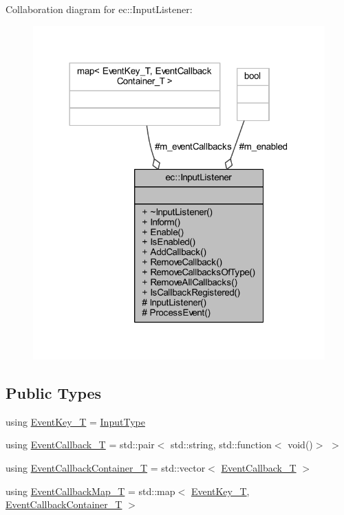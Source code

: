 Collaboration diagram for ec\+:\+:Input\+Listener\+:
\nopagebreak
\begin{figure}[H]
\begin{center}
\leavevmode
\includegraphics[width=318pt]{classec_1_1_input_listener__coll__graph}
\end{center}
\end{figure}
\subsection*{Public Types}
\begin{DoxyCompactItemize}
\item 
using \mbox{\hyperlink{classec_1_1_input_listener_a741cc6a2d59a823b5bfbc4e48e1a147f}{Event\+Key\+\_\+T}} = \mbox{\hyperlink{namespaceec_a5de6bdb8c4b2ed6e590e721ec998f964}{Input\+Type}}
\item 
using \mbox{\hyperlink{classec_1_1_input_listener_a6d62bd83a0cb80c979711d26722c8c6d}{Event\+Callback\+\_\+T}} = std\+::pair$<$ std\+::string, std\+::function$<$ void()$>$ $>$
\item 
using \mbox{\hyperlink{classec_1_1_input_listener_a3bb7086fdca1d1a76428b1e737e9e002}{Event\+Callback\+Container\+\_\+T}} = std\+::vector$<$ \mbox{\hyperlink{classec_1_1_input_listener_a6d62bd83a0cb80c979711d26722c8c6d}{Event\+Callback\+\_\+T}} $>$
\item 
using \mbox{\hyperlink{classec_1_1_input_listener_a13553604a5ae8c32fa95d304206aa01a}{Event\+Callback\+Map\+\_\+T}} = std\+::map$<$ \mbox{\hyperlink{namespaceec_a5de6bdb8c4b2ed6e590e721ec998f964}{Event\+Key\+\_\+T}}, \mbox{\hyperlink{classec_1_1_input_listener_a3bb7086fdca1d1a76428b1e737e9e002}{Event\+Callback\+Container\+\_\+T}} $>$
\end{DoxyCompactItemize}
